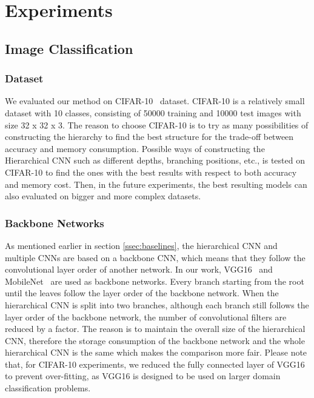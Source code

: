 
\lhead[\chaptername~\thechapter]{\rightmark}

\rhead[\leftmark]{}

\lfoot[\thepage]{}

\cfoot{}

\rfoot[]{\thepage}

\chapter{Experiments\label{experiments}}

\section{Image Classification}

\subsection{Dataset}
We evaluated our method on CIFAR-10~\cite{krizhevsky2009learning} dataset. 
CIFAR-10 is a relatively small dataset with 10 classes, consisting of 50000 training and 10000 test images with size 32 x 32 x 3.
The reason to choose CIFAR-10 is to try as many possibilities of constructing the hierarchy to find the best structure for the trade-off between accuracy and memory consumption.
Possible ways of constructing the Hierarchical CNN such as different depths, branching positions, etc., is tested on CIFAR-10 to find the ones with the best results with respect to both accuracy and memory cost. 
Then, in the future experiments, the best resulting models can also evaluated on bigger and more complex datasets.

\subsection{Backbone Networks}
As mentioned earlier in section \ref{ssec:baselines}, the hierarchical CNN and multiple CNNs are based on a backbone CNN, which means that they follow the convolutional layer order of another network.
In our work, VGG16~\cite{simonyan2014very} and MobileNet~\cite{howard2017mobilenets} are used as backbone networks.
Every branch starting from the root until the leaves follow the layer order of the backbone network. 
When the hierarchical CNN is split into two branches, although each branch still follows the layer order of the backbone network, the number of convolutional filters are reduced by a factor.
The reason is to maintain the overall size of the hierarchical CNN, therefore the storage consumption of the backbone network and the whole hierarchical CNN is the same which makes the comparison more fair.
Please note that, for CIFAR-10 experiments, we reduced the fully connected layer of VGG16 to prevent over-fitting, as VGG16 is designed to be used on larger domain classification problems.

